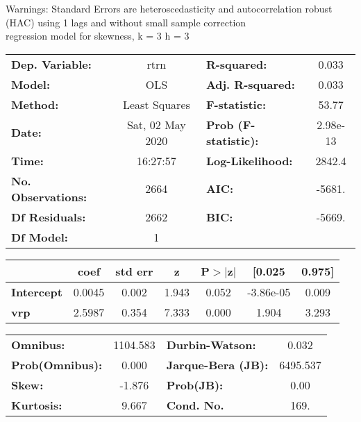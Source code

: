 Warnings: \newline
 [1] Standard Errors are heteroscedasticity and autocorrelation robust (HAC) using 1 lags and without small sample correction\\ 

regression model for skewness, k = 3 h = 3\begin{center}
\begin{tabular}{lclc}
\toprule
\textbf{Dep. Variable:}    &       rtrn       & \textbf{  R-squared:         } &     0.033   \\
\textbf{Model:}            &       OLS        & \textbf{  Adj. R-squared:    } &     0.033   \\
\textbf{Method:}           &  Least Squares   & \textbf{  F-statistic:       } &     53.77   \\
\textbf{Date:}             & Sat, 02 May 2020 & \textbf{  Prob (F-statistic):} &  2.98e-13   \\
\textbf{Time:}             &     16:27:57     & \textbf{  Log-Likelihood:    } &    2842.4   \\
\textbf{No. Observations:} &        2664      & \textbf{  AIC:               } &    -5681.   \\
\textbf{Df Residuals:}     &        2662      & \textbf{  BIC:               } &    -5669.   \\
\textbf{Df Model:}         &           1      & \textbf{                     } &             \\
\bottomrule
\end{tabular}
\begin{tabular}{lcccccc}
                   & \textbf{coef} & \textbf{std err} & \textbf{z} & \textbf{P$> |$z$|$} & \textbf{[0.025} & \textbf{0.975]}  \\
\midrule
\textbf{Intercept} &       0.0045  &        0.002     &     1.943  &         0.052        &    -3.86e-05    &        0.009     \\
\textbf{vrp}       &       2.5987  &        0.354     &     7.333  &         0.000        &        1.904    &        3.293     \\
\bottomrule
\end{tabular}
\begin{tabular}{lclc}
\textbf{Omnibus:}       & 1104.583 & \textbf{  Durbin-Watson:     } &    0.032  \\
\textbf{Prob(Omnibus):} &   0.000  & \textbf{  Jarque-Bera (JB):  } & 6495.537  \\
\textbf{Skew:}          &  -1.876  & \textbf{  Prob(JB):          } &     0.00  \\
\textbf{Kurtosis:}      &   9.667  & \textbf{  Cond. No.          } &     169.  \\
\bottomrule
\end{tabular}
\end{center}

